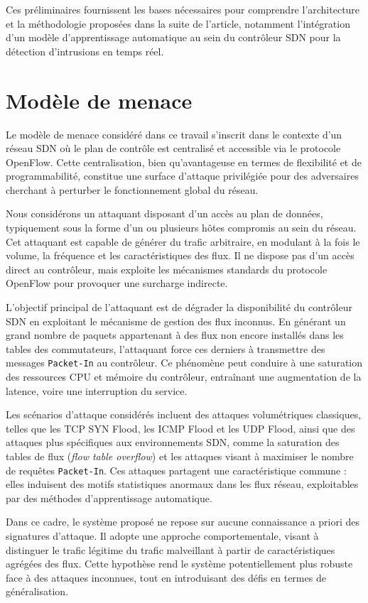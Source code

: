 \documentclass[11pt]{article}
\begin{document}
Ces préliminaires fournissent les bases nécessaires pour comprendre l’architecture et la méthodologie proposées dans la suite de l’article, notamment l’intégration d’un modèle d’apprentissage automatique au sein du contrôleur SDN pour la détection d’intrusions en temps réel.

\section{Modèle de menace}

Le modèle de menace considéré dans ce travail s’inscrit dans le contexte d’un réseau SDN où le plan de contrôle est centralisé et accessible via le protocole OpenFlow. Cette centralisation, bien qu’avantageuse en termes de flexibilité et de programmabilité, constitue une surface d’attaque privilégiée pour des adversaires cherchant à perturber le fonctionnement global du réseau.

Nous considérons un attaquant disposant d’un accès au plan de données, typiquement sous la forme d’un ou plusieurs hôtes compromis au sein du réseau. Cet attaquant est capable de générer du trafic arbitraire, en modulant à la fois le volume, la fréquence et les caractéristiques des flux. Il ne dispose pas d’un accès direct au contrôleur, mais exploite les mécanismes standards du protocole OpenFlow pour provoquer une surcharge indirecte.

L’objectif principal de l’attaquant est de dégrader la disponibilité du contrôleur SDN en exploitant le mécanisme de gestion des flux inconnus. En générant un grand nombre de paquets appartenant à des flux non encore installés dans les tables des commutateurs, l’attaquant force ces derniers à transmettre des messages \texttt{Packet-In} au contrôleur. Ce phénomène peut conduire à une saturation des ressources CPU et mémoire du contrôleur, entraînant une augmentation de la latence, voire une interruption du service.

Les scénarios d’attaque considérés incluent des attaques volumétriques classiques, telles que les TCP SYN Flood, les ICMP Flood et les UDP Flood, ainsi que des attaques plus spécifiques aux environnements SDN, comme la saturation des tables de flux (\textit{flow table overflow}) et les attaques visant à maximiser le nombre de requêtes \texttt{Packet-In}. Ces attaques partagent une caractéristique commune : elles induisent des motifs statistiques anormaux dans les flux réseau, exploitables par des méthodes d’apprentissage automatique.

Dans ce cadre, le système proposé ne repose sur aucune connaissance a priori des signatures d’attaque. Il adopte une approche comportementale, visant à distinguer le trafic légitime du trafic malveillant à partir de caractéristiques agrégées des flux. Cette hypothèse rend le système potentiellement plus robuste face à des attaques inconnues, tout en introduisant des défis en termes de généralisation.
\end{document}
